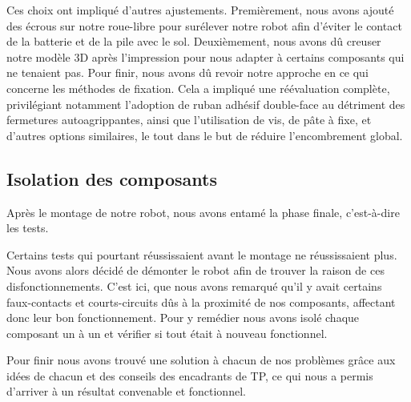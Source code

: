 Ces choix ont impliqué d'autres ajustements. Premièrement, nous avons ajouté des écrous sur notre roue-libre pour surélever notre robot afin d'éviter le contact de la batterie et de la pile avec le sol. Deuxièmement, nous avons dû creuser notre modèle 3D après l'impression pour nous adapter à certains composants qui ne tenaient pas. Pour finir, nous avons dû revoir notre approche en ce qui concerne les méthodes de fixation. Cela a impliqué une réévaluation complète, privilégiant notamment l'adoption de ruban adhésif double-face au détriment des fermetures autoagrippantes, ainsi que l'utilisation de vis, de pâte à fixe, et d'autres options similaires, le tout dans le but de réduire l'encombrement global. 

\subsection{Isolation des composants}
Après le montage de notre robot, nous avons entamé la phase finale, c'est-à-dire les tests.

Certains tests qui pourtant réussissaient avant le montage ne réussissaient plus. Nous avons alors décidé de démonter le robot afin de trouver la raison de ces disfonctionnements. C'est ici, que nous avons remarqué qu'il y avait certains faux-contacts et courts-circuits dûs à la proximité de nos composants, affectant donc leur bon fonctionnement. Pour y remédier nous avons isolé chaque composant un à un et vérifier si tout était à nouveau fonctionnel.

\bigbreak
Pour finir nous avons trouvé une solution à chacun de nos problèmes grâce aux idées de chacun et des conseils des encadrants de TP, ce qui nous a permis d'arriver à un résultat convenable et fonctionnel.



\newpage
